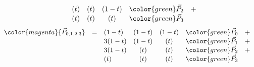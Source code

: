 \begin{frame}
{\[\begin{array}{lclccrc}
                                       & & (  t)&(  t)&(1-t)&{\color{green}\vec{P}_2} &+ \\
                                       & & (  t)&(  t)&(  t)&{\color{green}\vec{P}_3} &
  \end{array}
  \]
  }
  {\tiny
  \[
  \begin{array}{lclccrc}
    \color{magenta}{\vec{P}_{0,1,2,3}} &=& (1-t)&(1-t)&(1-t)&{\color{green}\vec{P}_0} &+ \\
                                       & & 3(1-t)&(1-t)&(  t)&{\color{green}\vec{P}_1} &+ \\
                                       & & 3(1-t)&(  t)&(  t)&{\color{green}\vec{P}_2} &+ \\
                                       & & (  t)&(  t)&(  t)&{\color{green}\vec{P}_3} &
  \end{array}
  \]
  }

\end{frame}


